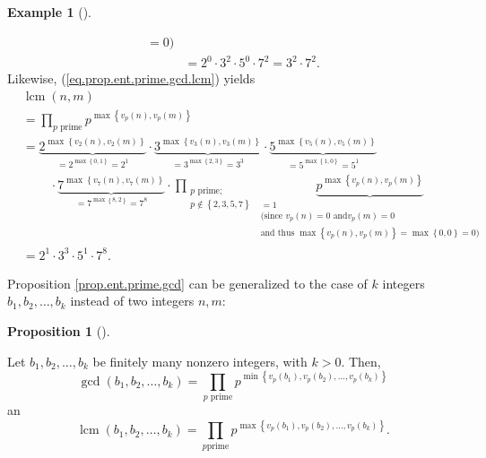 \documentclass[numbers=enddot,12pt,final,onecolumn,notitlepage]{scrartcl}%
\numberwithin{exer}{subsection}
\theoremstyle{definition}
\newtheorem{prop}[theo]{Proposition}
\newenvironment{proposition}[1][]
{\begin{prop}[#1]\begin{leftbar}}
{\end{leftbar}\end{prop}}
\newtheorem{exam}[theo]{Example}
\newenvironment{example}[1][]
{\begin{exam}[#1]\begin{leftbar}}
{\end{leftbar}\end{exam}}
\let\prodnonlimits\prod
\renewcommand{\prod}{\prodnonlimits\limits}
\begin{document}
\begin{example}
\begin{align*}
{{=0\text{)}}}\\
&  =2^{0}\cdot3^{2}\cdot5^{0}\cdot7^{2}=3^{2}\cdot7^{2}.
\end{align*}
Likewise, (\ref{eq.prop.ent.prime.gcd.lcm}) yields%
\begin{align*}
&  \operatorname{lcm}\left(  n,m\right) \\
&  =\prod_{p\text{ prime}}p^{\max\left\{  v_{p}\left(  n\right)  ,v_{p}\left(
m\right)  \right\}  }\\
&  =\underbrace{2^{\max\left\{  v_{2}\left(  n\right)  ,v_{2}\left(  m\right)
\right\}  }}_{=2^{\max\left\{  0,1\right\}  }=2^{1}}\cdot\underbrace{3^{\max
\left\{  v_{3}\left(  n\right)  ,v_{3}\left(  m\right)  \right\}  }}%
_{=3^{\max\left\{  2,3\right\}  }=3^{3}}\cdot\underbrace{5^{\max\left\{
v_{5}\left(  n\right)  ,v_{5}\left(  m\right)  \right\}  }}_{=5^{\max\left\{
1,0\right\}  }=5^{1}}\\
&  \ \ \ \ \ \ \ \ \ \ \cdot\underbrace{7^{\max\left\{  v_{7}\left(  n\right)
,v_{7}\left(  m\right)  \right\}  }}_{=7^{\max\left\{  8,2\right\}  }=7^{8}%
}\cdot\prod_{\substack{p\text{ prime;}\\p\notin\left\{  2,3,5,7\right\}
}}\underbrace{p^{\max\left\{  v_{p}\left(  n\right)  ,v_{p}\left(  m\right)
\right\}  }}_{\substack{=1\\\text{(since }v_{p}\left(  n\right)  =0\text{ and
}v_{p}\left(  m\right)  =0\\\text{and thus }\max\left\{  v_{p}\left(
n\right)  ,v_{p}\left(  m\right)  \right\}  =\max\left\{  0,0\right\}
=0\text{)}}}\\
&  =2^{1}\cdot3^{3}\cdot5^{1}\cdot7^{8}.
\end{align*}

\end{example}

Proposition \ref{prop.ent.prime.gcd} can be generalized to the case of $k$
integers $b_{1},b_{2},\ldots,b_{k}$ instead of two integers $n,m$:

\begin{proposition}
\label{prop.ent.prime.gcd-k}Let $b_{1},b_{2},\ldots,b_{k}$ be finitely many
nonzero integers, with $k>0$. Then,%
\begin{equation}
\gcd\left(  b_{1},b_{2},\ldots,b_{k}\right)  =\prod_{p\text{ prime}}%
p^{\min\left\{  v_{p}\left(  b_{1}\right)  ,v_{p}\left(  b_{2}\right)
,\ldots,v_{p}\left(  b_{k}\right)  \right\}  }
\label{eq.prop.ent.prime.gcd-k.gcd}%
\end{equation}
an%
\begin{equation}
\operatorname{lcm}\left(  b_{1},b_{2},\ldots,b_{k}\right)  =\prod_{p\text{
prime}}p^{\max\left\{  v_{p}\left(  b_{1}\right)  ,v_{p}\left(  b_{2}\right)
,\ldots,v_{p}\left(  b_{k}\right)  \right\}  }.
\label{eq.prop.ent.prime.gcd-k.lcm}%
\end{equation}

\end{proposition}
\end{document}
